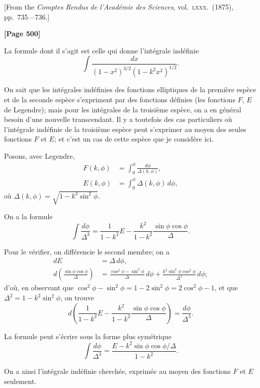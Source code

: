 \documentclass[11pt,a4paper]{book}
\begin{document}
\begin{center}
{\small[From the \textit{Comptes Rendus de l'Acad\' emie des Sciences}, vol.\ \textsc{lxxx}.\ (1875),
pp.\ 735---736.]}
\end{center}

\textbf{[Page 500]}

La formule dont il s'agit est celle qui donne l'int\' egrale ind\' efinie
\[\int\! \frac{dx}{(1-x^{2})^{3/2}(1-k^{2}x^{2})^{1/2}}.\]

On sait que les int\' egrales ind\' efinies des fonctions elliptiques de la premi\` ere esp\` ece
et de la seconde esp\` ece s'expriment par des fonctions d\' efinies (les fonctions $F$, $E$ de
Legendre); mais pour les int\' egrales de la troisi\` eme esp\` ece, on a en g\' en\' eral besoin
d'une nouvelle transcendant. Il y a toutefois des cas particuliers o\` u l'int\' egrale ind\' efinie
de la troisi\` eme esp\` ece peut s'exprimer au moyen des seules fonctions $F$ et $E$; et
c'est un cas de cette esp\` ece que je consid\` ere ici.

Posons, avec Legendre,
\begin{align*}
F(k, \phi) &= \int_{0}^{\phi} \frac{d\phi}{\Delta(k, \phi)}, \\
E(k, \phi) &= \int_{0}^{\phi} \Delta(k, \phi)\, d\phi,
\end{align*}
o\` u $\Delta(k, \phi) = \sqrt{1-k^{2}\sin^{2}\phi}$.

On a la formule
\[\int\! \frac{d\phi}{\Delta^{3}} = \frac{1}{1-k^{2}} E - \frac{k^{2}}{1-k^{2}} \frac{\sin\phi\cos\phi}{\Delta}.\]

Pour le v\' erifier, on diff\' erencie le second membre; on a
\begin{align*}
dE &= \Delta\, d\phi, \\
d\left(\frac{\sin\phi\cos\phi}{\Delta}\right) &= \frac{\cos^{2}\phi - \sin^{2}\phi}{\Delta}\, d\phi
+ \frac{k^{2}\sin^{2}\phi\cos^{2}\phi}{\Delta^{3}}\, d\phi;
\end{align*}
d'o\` u, en observant que $\cos^{2}\phi - \sin^{2}\phi = 1 - 2\sin^{2}\phi = 2\cos^{2}\phi - 1$,
et que $\Delta^{2} = 1 - k^{2}\sin^{2}\phi$, on trouve
\[d\left(\frac{1}{1-k^{2}} E - \frac{k^{2}}{1-k^{2}} \frac{\sin\phi\cos\phi}{\Delta}\right)
= \frac{d\phi}{\Delta^{3}}.\]

La formule peut s'\' ecrire sous la forme plus sym\' etrique
\[\int\! \frac{d\phi}{\Delta^{3}} = \frac{E - k^{2}\sin\phi\cos\phi/\Delta}{1-k^{2}}.\]

On a ainsi l'int\' egrale ind\' efinie cherch\' ee, exprim\' ee au moyen des fonctions
$F$ et $E$ seulement.
\end{document}
